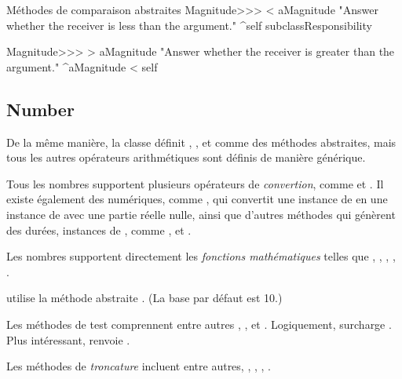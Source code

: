 \documentclass[a4paper,10pt,twoside]{book}
\begin{document}
\begin{method}{M\'ethodes de comparaison abstraites}
Magnitude>>> < aMagnitude 
    "Answer whether the receiver is less than the argument."
    ^self subclassResponsibility

Magnitude>>> > aMagnitude 
    "Answer whether the receiver is greater than the argument."
    ^aMagnitude < self
\end{method}

\subsection{Number}

De la m\^eme mani\`ere, la classe  d\'efinit , ,  et  comme des m\'ethodes abstraites, mais tous les autres op\'erateurs arithm\'etiques sont d\'efinis de mani\`ere g\'en\'erique.

Tous les nombres supportent plusieurs op\'erateurs de  \emph{convertion}, comme  et . Il existe \'egalement des  num\'eriques,
comme , qui convertit une instance de  en une instance de  avec une partie r\'eelle nulle, ainsi que d'autres m\'ethodes qui g\'en\`erent des dur\'ees, instances de , comme ,  et .

Les nombres supportent directement les \emph{fonctions math\'ematiques} telles que , , , , .

 utilise la m\'ethode abstraite . (La base par d\'efaut est 10.)

Les m\'ethodes de test comprennent entre autres , ,  et . Logiquement,  surcharge . Plus int\'eressant,  renvoie .

Les m\'ethodes de \emph{troncature} incluent entre autres, , , , .
\end{document}
